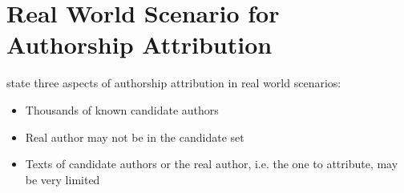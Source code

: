 \section{Real World Scenario for Authorship Attribution}
\label{sec:real_world_scenario_authorship_attribution}

\citet{koppel_authorship_2011} state three aspects of authorship attribution in real world scenarios:
\begin{itemize}
    \item Thousands of known candidate authors
    \item Real author may not be in the candidate set
    \item Texts of candidate authors or the real author, i.e. the one to attribute, may be very limited
\end{itemize}